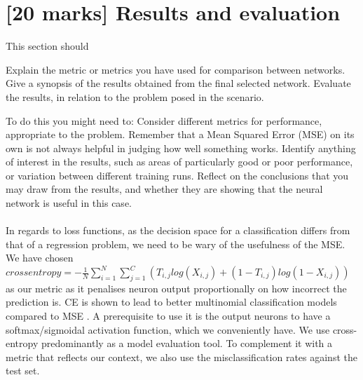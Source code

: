 \documentclass[11pt,a4paper]{article}
\begin{document}
\section{[20 marks] Results and evaluation}
\label{sec:results}
This section should
\begin{outline}
  \1 Explain the metric or metrics you have used for comparison between networks.
  \1 Give a synopsis of the results obtained from the final selected network.
  \1 Evaluate the results, in relation to the problem posed in the scenario. 
\end{outline}
\begin{outline}
To do this you might need to:
  \1 Consider different metrics for performance, appropriate to the problem. Remember that a Mean Squared Error (MSE) on its own is not always helpful in judging how well something works.
  \1 Identify anything of interest in the results, such as areas of particularly good or poor performance, or variation between different training runs.
  \1 Reflect on the conclusions that you may draw from the results, and whether they are showing that the neural network is useful in this case.
\end{outline}

\paragraph{}
In regards to loss functions, as the decision space for a classification differs from that of a regression problem, we need to be wary of the usefulness of the MSE. We have chosen \(crossentropy = -\frac{1}{N}\sum_{i=1}^N\sum_{j=1}^C(T_{i,j}log(X_{i,j})+(1 - T_{i,j})log(1-X_{i,j}))\) as our metric as it penalises neuron output proportionally on how incorrect the prediction is. CE is shown to lead to better multinomial classification models compared to MSE \autocite{Golik2013CrossentropyVS}. A prerequisite to use it is the output neurons to have a softmax/sigmoidal activation function, which we conveniently have. We use cross-entropy predominantly as a model evaluation tool. To complement it with a metric that reflects our context, we also use the misclassification rates against the test set.
\end{document}
